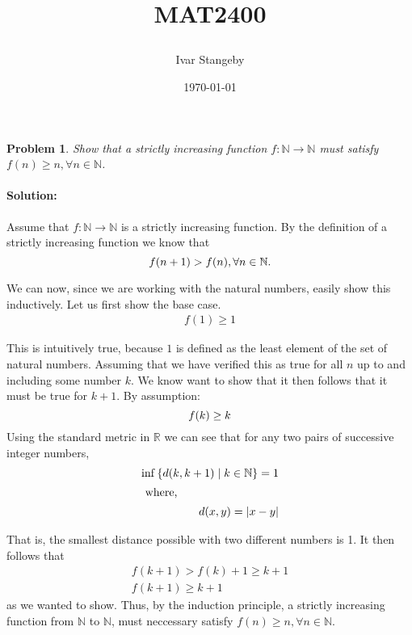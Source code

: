 \documentclass[a4paper]{article}
\title{
  \huge MAT2400\\
  \centering{Assignment 1}
  \author{Ivar Stangeby}
  \date{\today}
}
\newtheorem{prb}{Problem}
\begin{document}
\maketitle
\begin{prb}
  Show that a strictly increasing function $f: \mathbb{N} \rightarrow
  \mathbb{N}$ must satisfy $f(n) \geq n, \forall n \in \mathbb{N}$.
\end{prb}

\paragraph{Solution: }
Assume that $f: \mathbb{N} \rightarrow \mathbb{N}$ is a strictly increasing
function.  By the definition of a strictly increasing function we know that
\begin{equation}
  \notag
  f(n + 1) > f(n), \forall n \in \mathbb{N}.
\end{equation}

We can now, since we are working with the natural numbers, easily show this
inductively.  Let us first show the base case.
\begin{align*}
  \label{eq:}
  f(1) \geq 1  
\end{align*}

This is intuitively true, because $1$ is defined as the least element of the
set of natural numbers.  Assuming that we have verified this as true for all
$n$ up to and including some number $k$.  We know want to show that it then
follows that it must be true for $k + 1$. 
By assumption:
\begin{equation}
  \notag
  f(k) \geq k
\end{equation}
Using the standard metric in $\mathbb{R}$ we can see that for any two pairs of successive
integer numbers, 
\begin{align*}
  \inf\left\{ d(k, k+1) \mid k \in \mathbb{N} \right \} = 1 \\
  \intertext{ where,}
  d(x, y) = |x - y|
\end{align*}

That is, the smallest distance possible with two different numbers is 1.  It
then follows that
\begin{align*}
  \label{eq:}
  f(k+1) > f(k) + 1 \geq k+1 \\
  f(k+1) \geq k+1
\end{align*}
as we wanted to show.  Thus, by the induction principle, a strictly increasing
function from $\mathbb{N}$ to $\mathbb{N}$, must neccessary satisfy $f(n) \geq
n, \forall n \in \mathbb{N}$.
\end{document}
